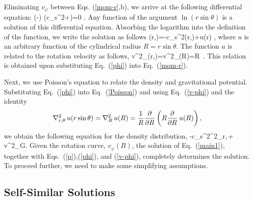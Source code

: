 Eliminating $v_\varphi$ between 
Eqs. (\ref{mom-r},b), we arrive at the following differential equation:
\beq
\left(-\pd{}{\,\ln\sin\theta}{}\right)
\left(c_s^2\ln\rho+\phi\right)=0 .
\eeq
Any function of the argument $\ln(r\sin\theta)$ is a solution of this 
differential equation. Absorbing the logarithm into the definition of
the function, we write the solution as follows
\beq
\phi(r,\theta)=-c_s^2\ln\rho(r,\theta)+u(r\sin\theta) ,
\label{phi}
\eeq
where $u$ is an arbitrary function of the cylindrical radius $R=r\sin\theta$.
The function $u$ is related to the rotation velocity as follows,
\beq
v^2_\varphi(r,\theta)=v^2_\varphi(R)=R\, .
\label{v-phi}
\eeq
This relation is obtained upon substituting Eq.\ (\ref{phi}) 
into Eq.\ (\ref{mom-r}).

Next, we use Poisson's equation to relate the density and gravitational
potential. Substituting Eq.\ (\ref{phi}) into Eq.\ (\ref{Poisson})
and using  Eq.\ (\ref{v-phi}) and the identity
$$
\nabla^2_{r,\theta}\,u(r\sin\theta)
=\nabla_R^2\,u(R)
=\frac{1}{R}\frac{\partial^{}{}}{\partial {R}^{}}\left(R\frac{\partial^{}{}}{\partial {R}^{}}\,u(R)\right),
$$ 
we obtain the following equation for the density distribution,
\beq
-c_s^2\nabla^2_{r,\theta}\,\ln\rho+\,v^2_\pi G\rho .
\label{main1}
\eeq
Given the rotation curve, $v_\varphi(R)$, the solution of Eq.\ (\ref{main1}), 
together with Eqs.\ (\ref{p}),(\ref{phi}), and (\ref{v-phi}), completely 
determines the solution. To proceed further, we need to make some simplifying 
assumptions.

\subsection{Self-Similar Solutions}

